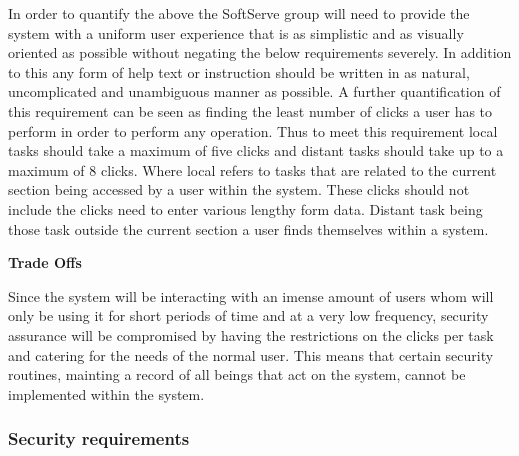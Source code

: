 \begin{flushleft}
In order to quantify the above the SoftServe group will need to provide the system with a uniform user experience that is as simplistic and as visually oriented as possible without negating the below requirements severely. In addition to this any form of help text or instruction should be written in as natural, uncomplicated and unambiguous manner as possible. A further quantification of this requirement can be seen as finding the least number of clicks a user has to perform in order to perform any operation. Thus to meet this requirement local tasks should take a maximum of five clicks and distant tasks should take up to a maximum of 8 clicks. Where local refers to tasks that are related to the current section being accessed by a user within the system. These clicks should not include the clicks need to enter various lengthy form data. Distant task being those task outside the current section a user finds themselves within a system.
%
%
\vspace{0.1in}

\textbf{Trade Offs}

Since the system will be interacting with an imense amount of users whom will only be using it for short periods of time and at a very low frequency, security assurance will be compromised by having the restrictions on the clicks per task and catering for the needs of the normal user. This means that certain security routines, mainting a record of all beings that act on the system, cannot be implemented within the system. %
\end{flushleft}

\subsubsection{Security requirements}

